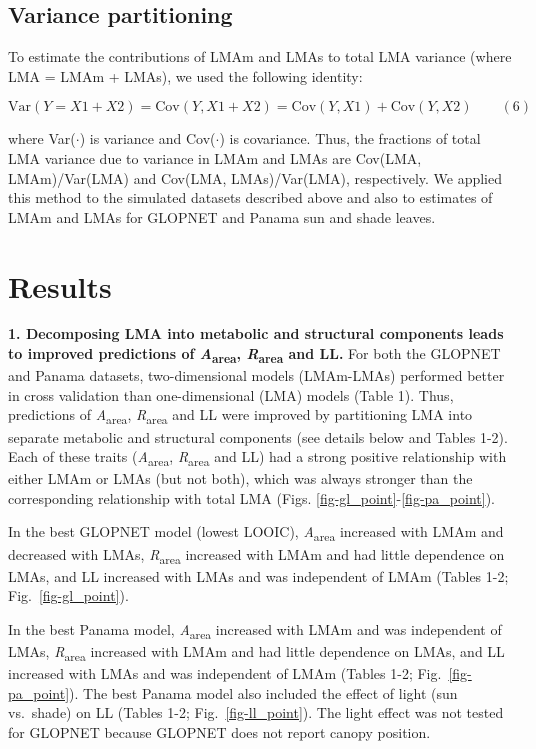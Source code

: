 \documentclass[
  12pt,
  letterpaper,
  DIV=11,
  numbers=noendperiod]{scrartcl}
\begin{document}
\hypertarget{variance-partitioning}{%
\subsection{Variance partitioning}\label{variance-partitioning}}

To estimate the contributions of LMAm and LMAs to total LMA variance
(where LMA = LMAm + LMAs), we used the following identity:

\[
\mathrm{Var}(Y = X1 + X2) = \mathrm{Cov}(Y, X1+X2) = \mathrm{Cov}(Y,X1) + \mathrm{Cov}(Y,X2) \qquad(6)
\]

where Var(\(\cdot\)) is variance and Cov(\(\cdot\)) is covariance. Thus,
the fractions of total LMA variance due to variance in LMAm and LMAs are
Cov(LMA, LMAm)/Var(LMA) and Cov(LMA, LMAs)/Var(LMA), respectively. We
applied this method to the simulated datasets described above and also
to estimates of LMAm and LMAs for GLOPNET and Panama sun and shade
leaves.

\hypertarget{results}{%
\section{Results}\label{results}}

\textbf{1. Decomposing LMA into metabolic and structural components
leads to improved predictions of \emph{A}\textsubscript{area},
\emph{R}\textsubscript{area} and LL.} For both the GLOPNET and Panama
datasets, two-dimensional models (LMAm-LMAs) performed better in cross
validation than one-dimensional (LMA) models (Table 1). Thus,
predictions of \emph{A}\textsubscript{area},
\emph{R}\textsubscript{area} and LL were improved by partitioning LMA
into separate metabolic and structural components (see details below and
Tables 1-2). Each of these traits (\emph{A}\textsubscript{area},
\emph{R}\textsubscript{area} and LL) had a strong positive relationship
with either LMAm or LMAs (but not both), which was always stronger than
the corresponding relationship with total LMA (Figs.
\ref{fig-gl_point}-\ref{fig-pa_point}).

In the best GLOPNET model (lowest LOOIC), \emph{A}\textsubscript{area}
increased with LMAm and decreased with LMAs,
\emph{R}\textsubscript{area} increased with LMAm and had little
dependence on LMAs, and LL increased with LMAs and was independent of
LMAm (Tables 1-2; Fig.~\ref{fig-gl_point}).

In the best Panama model, \emph{A}\textsubscript{area} increased with
LMAm and was independent of LMAs, \emph{R}\textsubscript{area} increased
with LMAm and had little dependence on LMAs, and LL increased with LMAs
and was independent of LMAm (Tables 1-2; Fig.~\ref{fig-pa_point}). The
best Panama model also included the effect of light (sun vs.~shade) on
LL (Tables 1-2; Fig.~\ref{fig-ll_point}). The light effect was not
tested for GLOPNET because GLOPNET does not report canopy position.
\end{document}
